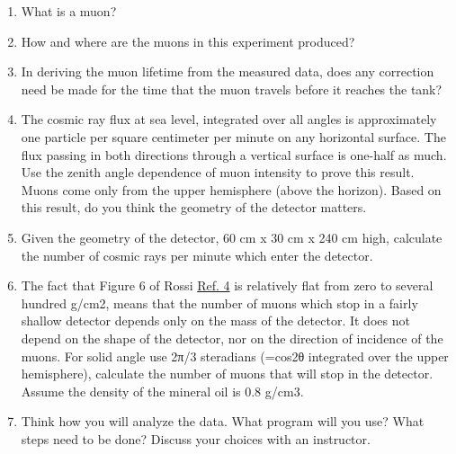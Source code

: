 \documentclass{../signatures}
\begin{document}
\maketitle

\names

\prelab

\begin{enumerate}

    \item What is a muon?
    
    \item How and where are the muons in this experiment produced?

    \item In deriving the muon lifetime from the measured data, does any correction need be made for the time that the muon travels before it reaches the tank?

    \item The cosmic ray flux at sea level, integrated over all angles is approximately one particle per square centimeter per minute on any horizontal surface. The flux passing in both directions through a vertical surface is one-half as much. Use the zenith angle dependence of muon intensity to prove this result. Muons come only from the upper hemisphere (above the horizon). Based on this result, do you think the geometry of the detector matters.

    \item Given the geometry of the detector, 60 cm x 30 cm x 240 cm high, calculate the number of cosmic rays per minute which enter the detector.
    
    \item The fact that Figure 6 of Rossi \href{http://physics111.lib.berkeley.edu/Physics111/Reprints/MUO/02-Cosmic-Ray\_Phenomena.pdf}{Ref. 4} is relatively flat from zero to several hundred g/cm2, means that the number of muons which stop in a fairly shallow detector depends only on the mass of the detector. It does not depend on the shape of the detector, nor on the direction of incidence of the muons. For solid angle use 2π/3 steradians (=cos2θ integrated over the upper hemisphere), calculate the number of muons that will stop in the detector. Assume the density of the mineral oil is 0.8 g/cm3.

    \item Think how you will analyze the data. What program will you use? What steps need to be done? Discuss your choices with an instructor.
       \\[36pt]
\end{enumerate}
\end{document}
